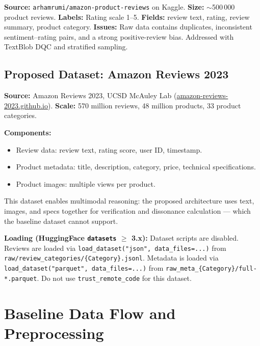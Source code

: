 \documentclass[12pt,a4paper]{article}
\begin{document}
\textbf{Source:} \texttt{arhamrumi/amazon-product-reviews} on Kaggle.
\textbf{Size:} $\sim$500\,000 product reviews.
\textbf{Labels:} Rating scale 1--5.
\textbf{Fields:} review text, rating, review summary, product category.
\textbf{Issues:} Raw data contains duplicates, inconsistent sentiment--rating pairs, and a
strong positive-review bias. Addressed with TextBlob DQC and stratified sampling.

\subsection{Proposed Dataset: Amazon Reviews 2023}

\textbf{Source:} Amazon Reviews 2023, UCSD McAuley Lab
(\url{amazon-reviews-2023.github.io}).
\textbf{Scale:} 570 million reviews, 48 million products, 33 product categories.

\textbf{Components:}
\begin{itemize}[leftmargin=*]
  \item Review data: review text, rating score, user ID, timestamp.
  \item Product metadata: title, description, category, price, technical specifications.
  \item Product images: multiple views per product.
\end{itemize}

This dataset enables multimodal reasoning: the proposed architecture uses text, images, and
specs together for verification and dissonance calculation --- which the baseline dataset
cannot support.

\textbf{Loading (HuggingFace \texttt{datasets} $\geq$ 3.x):} Dataset scripts are disabled.
Reviews are loaded via \texttt{load\_dataset("json", data\_files=...)} from
\texttt{raw/review\_categories/\{Category\}.jsonl}. Metadata is loaded via
\texttt{load\_dataset("parquet", data\_files=...)} from \texttt{raw\_meta\_\{Category\}/full-*.parquet}.
Do not use \texttt{trust\_remote\_code} for this dataset.

\section{Baseline Data Flow and Preprocessing}
\end{document}
